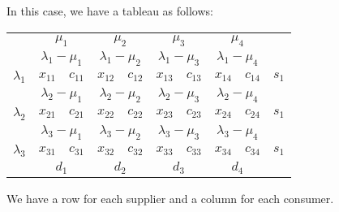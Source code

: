 \documentclass[a4paper]{article}
\begin{document}
In this case, we have a tableau as follows:
\newcommand\bb[1]{\multicolumn{1}{|c|}{#1}}
\newcommand\bbb[1]{\multicolumn{2}{c|}{#1}}
\newcommand\bbbb[1]{\multicolumn{2}{c}{#1}}
\begin{center}
  \begin{tabular}{c|cc|cc|cc|cc|c}
    \multicolumn{1}{c}{ } & \bbbb{$\mu_1$} & \bbbb{$\mu_2$} & \bbbb{$\mu_3$} & \bbbb{$\mu_4$}\\\cline{2-9}
    & \bbb{$\lambda_1 - \mu_1$} & \bbb{$\lambda_1 - \mu_2$} & \bbb{$\lambda_1 - \mu_3$} & \bbb{$\lambda_1 - \mu_4$}\\\cline{3-3}\cline{5-5}\cline{7-7}\cline{9-9}
    $\lambda_1$ & $x_{11}$ & \bb{$c_{11}$} & $x_{12}$ & \bb{$c_{12}$} & $x_{13}$ & \bb{$c_{13}$} & $x_{14}$ & \bb{$c_{14}$} & $s_1$\\\cline{2-9}
    & \bbb{$\lambda_2 - \mu_1$} & \bbb{$\lambda_2 - \mu_2$} & \bbb{$\lambda_2 - \mu_3$} & \bbb{$\lambda_2 - \mu_4$}\\\cline{3-3}\cline{5-5}\cline{7-7}\cline{9-9}
    $\lambda_2$ & $x_{21}$ & \bb{$c_{21}$} & $x_{22}$ & \bb{$c_{22}$} & $x_{23}$ & \bb{$c_{23}$} & $x_{24}$ & \bb{$c_{24}$} & $s_1$\\\cline{2-9}
    & \bbb{$\lambda_3 - \mu_1$} & \bbb{$\lambda_3 - \mu_2$} & \bbb{$\lambda_3 - \mu_3$} & \bbb{$\lambda_3 - \mu_4$}\\\cline{3-3}\cline{5-5}\cline{7-7}\cline{9-9}
    $\lambda_3$ & $x_{31}$ & \bb{$c_{31}$} & $x_{32}$ & \bb{$c_{32}$} & $x_{33}$ & \bb{$c_{33}$} & $x_{34}$ & \bb{$c_{34}$} & $s_1$\\\cline{2-9}
    \multicolumn{1}{c}{ }& \bbbb{$d_1$} & \bbbb{$d_2$} & \bbbb{$d_3$} & \bbbb{$d_4$}\\
  \end{tabular}
\end{center}
We have a row for each supplier and a column for each consumer.
\end{document}
